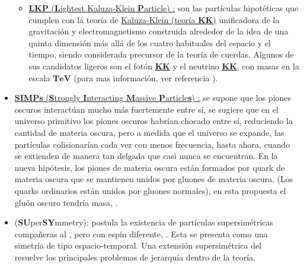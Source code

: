 \begin{itemize}
\begin{itemize}

\item \href{https://en.wikipedia.org/wiki/Kaluza\%E2\%80\%93Klein_theory}{\textbf{LKP} (\textbf{L}ightest {K}aluza-Klein \textbf{P}article) :} son las partículas hipotéticas que cumplen con la teoría de \href{https://en.wikipedia.org/wiki/Kaluza\%E2\%80\%93Klein_theory}{Kaluza-Klein (teoría \textbf{KK})} unificadora de la gravitación y electromagnetismo construida alrededor de la idea de una quinta dimensión más allá de los cuatro habituales del espacio y el tiempo, siendo considerada precursor de la teoría de cuerdas. Algunos de sus candidatos ligeros son el fotón \href{https://en.wikipedia.org/wiki/Kaluza\%E2\%80\%93Klein_theory}{\textbf{KK}} y el neutrino \href{https://en.wikipedia.org/wiki/Kaluza\%E2\%80\%93Klein_theory}{\textbf{KK}}, con masas en la escala $\mathbf{TeV}$ (para mas información, ver referencia \cite{servant_is_2003}).

\end{itemize}
\item \href{https://es.scribd.com/document/273103231/Dark-Pion-Particles-May-Explain-Universe-s-Invisible-Matter}{\textbf{SIMPs} (\textbf{S}trongly \textbf{I}nteracting \textbf{M}assive \textbf{P}article\textbf{s}) :} se supone que los piones oscuros interactúan mucho más fuertemente entre sí, se sugiere que en el universo primitivo los piones oscuros habrían chocado entre sí, reduciendo la cantidad de materia oscura, pero a medida que el universo se expande, las partículas colisionarían cada vez con menos frecuencia, hasta ahora, cuando se extienden de manera tan delgada que casi nunca se encuentran. En la nueva hipótesis, los piones de materia oscura están formados por quark de materia oscura que se mantienen unidos por gluones de materia oscura. (Los quarks ordinarios están unidos por gluones normales), en esta propuesta el gluón oscuro tendría masa, \citep{simps_2019}.

\item  \SUSY (\textbf{SU}per\textbf{SY}mmetry): postula la existencia de partículas supersimétricas compañeras al \ME, pero con espín diferente, \citep{susy_2020}. Esta se presenta como una simetría de tipo espacio-temporal. Una extensión supersimétrica del \ME ~ resuelve los principales problemas de jerarquía dentro de la teoría.
\end{itemize}

